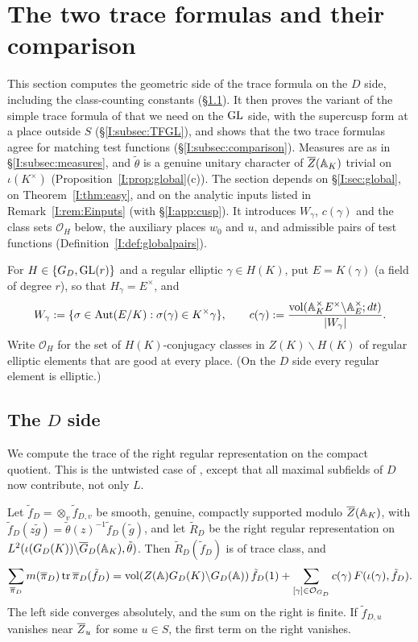 \section{The two trace formulas and their comparison}\label{I:sec:TF}
This section computes the geometric side of the trace formula on the $D$ side, including the class-counting constants (\S\ref{I:subsec:TFD}). It then proves the variant of the simple trace formula of \cite[\S18]{FK86} that we need on the $\mathrm{GL}$ side, with the supercusp form at a place outside $S$ (\S\ref{I:subsec:TFGL}), and shows that the two trace formulas agree for matching test functions (\S\ref{I:subsec:comparison}). Measures are as in \S\ref{I:subsec:measures}, and $\tilde\theta$ is a genuine unitary character of $\overline{Z}(\mathbb{A}_K)$ trivial on $\iota(K^\times)$ (Proposition~\ref{I:prop:global}(c)). The section depends on \S\ref{I:sec:global}, on Theorem~\ref{I:thm:easy}, and on the analytic inputs listed in Remark~\ref{I:rem:Einputs} (with \S\ref{I:app:cusp}). It introduces $W_\gamma$, $c(\gamma)$ and the class sets $\mathcal O_H$ below, the auxiliary places $w_0$ and $u$, and admissible pairs of test functions (Definition~\ref{I:def:globalpairs}).

For $H\in\{G_D,\mathrm{GL}(r)\}$ and a regular elliptic $\gamma\in H(K)$, put $E=K(\gamma)$ (a field of degree $r$), so that $H_\gamma=E^\times$, and
\[ W_\gamma:=\{\sigma\in\operatorname{Aut}(E/K):\sigma(\gamma)\in K^\times\gamma\},\qquad c(\gamma):=\frac{\operatorname{vol}(\mathbb{A}_K^\times E^\times\backslash\mathbb{A}_E^\times;dt)}{|W_\gamma|}. \]
Write $\mathcal O_H$ for the set of $H(K)$-conjugacy classes in $Z(K)\backslash H(K)$ of regular elliptic elements that are good at every place. (On the $D$ side every regular element is elliptic.)

\subsection{The $D$ side}\label{I:subsec:TFD}
We compute the trace of the right regular representation on the compact quotient. This is the untwisted case of \cite[Prop.~6.6]{JC26a}, except that all maximal subfields of $D$ now contribute, not only $L$.

\begin{proposition}\label{I:prop:geomD}
Let $\tilde f_D=\otimes_v\tilde f_{D,v}$ be smooth, genuine, compactly supported modulo $\overline{Z}(\mathbb{A}_K)$, with $\tilde f_D(z\tilde g)=\tilde\theta(z)^{-1}\tilde f_D(\tilde g)$, and let $\tilde R_D$ be the right regular representation on $L^2(\iota(G_D(K))\backslash\overline{G}_D(\mathbb{A}_K),\tilde\theta)$. Then $\tilde R_D(\tilde f_D)$ is of trace class, and
\[ \sum_{\overline{\pi}_D}m(\overline{\pi}_D)\operatorname{tr}\overline{\pi}_D(\tilde f_D)=\operatorname{vol}(Z(\mathbb{A})G_D(K)\backslash G_D(\mathbb{A}))\,\tilde f_D(1)+\sum_{[\gamma]\in\mathcal O_{G_D}}c(\gamma)\,F(\iota(\gamma),\tilde f_D). \]
The left side converges absolutely, and the sum on the right is finite. If $\tilde f_{D,u}$ vanishes near $\overline{Z}_u$ for some $u\in S$, the first term on the right vanishes.
\end{proposition}

